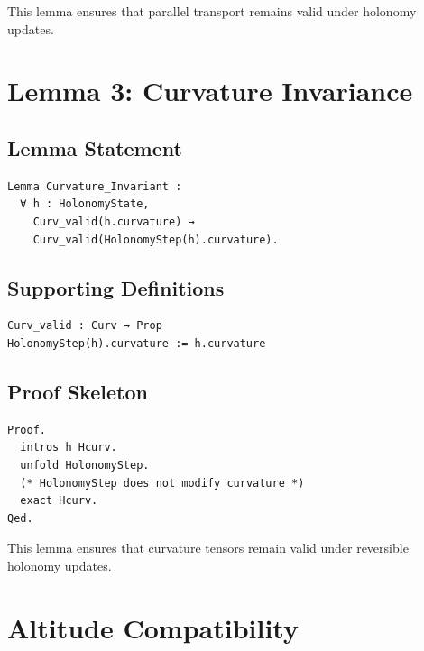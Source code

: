 \documentclass[11pt]{article}
\begin{document}
This lemma ensures that parallel transport remains valid under holonomy updates.

\newpage


\section{Lemma 3: Curvature Invariance}

\subsection{Lemma Statement}

\begin{verbatim}
Lemma Curvature_Invariant :
  ∀ h : HolonomyState,
    Curv_valid(h.curvature) →
    Curv_valid(HolonomyStep(h).curvature).
\end{verbatim}

\subsection{Supporting Definitions}

\begin{verbatim}
Curv_valid : Curv → Prop
HolonomyStep(h).curvature := h.curvature
\end{verbatim}

\subsection{Proof Skeleton}

\begin{verbatim}
Proof.
  intros h Hcurv.
  unfold HolonomyStep.
  (* HolonomyStep does not modify curvature *)
  exact Hcurv.
Qed.
\end{verbatim}

This lemma ensures that curvature tensors remain valid under reversible holonomy
updates.

\newpage


\section{Altitude Compatibility}
\end{document}
